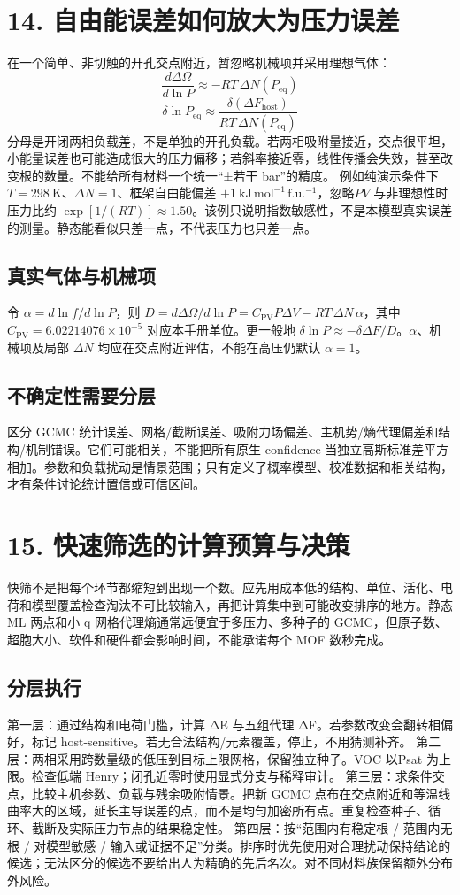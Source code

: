 \documentclass[UTF8,a4paper,11pt]{ctexart}
\begin{document}
\section*{14. 自由能误差如何放大为压力误差}
在一个简单、非切触的开孔交点附近，暂忽略机械项并采用理想气体：
\begin{equation*}
\frac{d\Delta\Omega}{d\ln P}\approx-RT\,\Delta N(P_{\mathrm{eq}})
\end{equation*}
\begin{equation*}
\delta\ln P_{\mathrm{eq}}\approx\frac{\delta(\Delta F_{\mathrm{host}})}{RT\,\Delta N(P_{\mathrm{eq}})}
\end{equation*}
分母是开闭两相负载差，不是单独的开孔负载。若两相吸附量接近，交点很平坦，小能量误差也可能造成很大的压力偏移；若斜率接近零，线性传播会失效，甚至改变根的数量。不能给所有材料一个统一“±若干 bar”的精度。
例如纯演示条件下 \(T=298\ \mathrm{K}\)、\(\Delta N=1\)、框架自由能偏差 \(+1\ \mathrm{kJ\,mol^{-1}\,f.u.^{-1}}\)，忽略\(PV\) 与非理想性时压力比约 \(\exp[1/(RT)]\approx1.50\)。该例只说明指数敏感性，不是本模型真实误差的测量。静态能看似只差一点，不代表压力也只差一点。
\subsection*{真实气体与机械项}
令 \(\alpha=d\ln f/d\ln P\)，则 \(D=d\Delta\Omega/d\ln P=C_{\mathrm{PV}}P\Delta V-RT\,\Delta N\,\alpha\)，其中 \(C_{\mathrm{PV}}=6.02214076\times10^{-5}\) 对应本手册单位。更一般地 \(\delta\ln P\approx-\delta\Delta F/D\)。\(\alpha\)、机械项及局部 \(\Delta N\) 均应在交点附近评估，不能在高压仍默认 \(\alpha=1\)。
\subsection*{不确定性需要分层}
区分 GCMC 统计误差、网格/截断误差、吸附力场偏差、主机势/熵代理偏差和结构/机制错误。它们可能相关，不能把所有原生 confidence 当独立高斯标准差平方相加。参数和负载扰动是情景范围；只有定义了概率模型、校准数据和相关结构，才有条件讨论统计置信或可信区间。
\clearpage
\section*{15. 快速筛选的计算预算与决策}
快筛不是把每个环节都缩短到出现一个数。应先用成本低的结构、单位、活化、电荷和模型覆盖检查淘汰不可比较输入，再把计算集中到可能改变排序的地方。静态 ML 两点和小 q 网格代理熵通常远便宜于多压力、多种子的 GCMC，但原子数、超胞大小、软件和硬件都会影响时间，不能承诺每个 MOF 数秒完成。
\subsection*{分层执行}
第一层：通过结构和电荷门槛，计算 ΔE 与五组代理 ΔF。若参数改变会翻转相偏好，标记 host-sensitive。若无合法结构/元素覆盖，停止，不用猜测补齐。
第二层：两相采用跨数量级的低压到目标上限网格，保留独立种子。VOC 以Psat 为上限。检查低端 Henry；闭孔近零时使用显式分支与稀释审计。
第三层：求条件交点，比较主机参数、负载与残余吸附情景。把新 GCMC 点布在交点附近和等温线曲率大的区域，延长主导误差的点，而不是均匀加密所有点。重复检查种子、循环、截断及实际压力节点的结果稳定性。
第四层：按“范围内有稳定根 / 范围内无根 / 对模型敏感 / 输入或证据不足”分类。排序时优先使用对合理扰动保持结论的候选；无法区分的候选不要给出人为精确的先后名次。对不同材料族保留额外分布外风险。
\end{document}
